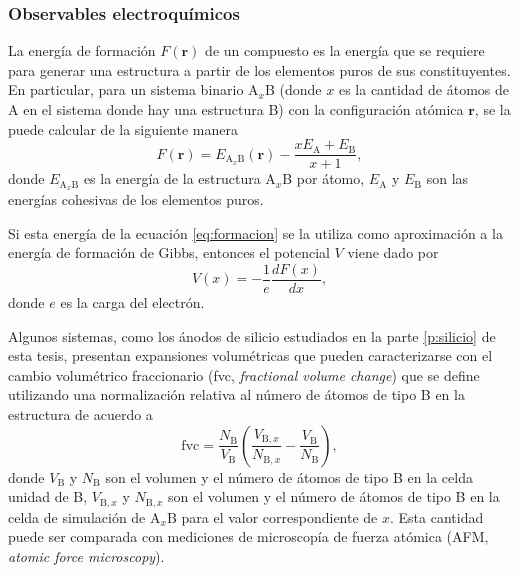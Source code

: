 \subsubsection{Observables electroquímicos}\label{ss:electrochim}

La energía de formación $F(\mathbf{r})$ de un compuesto es la energía que se requiere para generar 
una estructura a partir de los elementos puros de sus constituyentes. En particular, para un sistema binario A$_x$B (donde $x$ es la 
cantidad de átomos de A en el sistema donde hay una estructura B) con la configuración atómica
$\mathbf{r}$, se la puede calcular de la siguiente manera
\begin{equation}\label{eq:formacion}
    F(\mathbf{r}) = E_{\text{A}_x\text{B}}(\mathbf{r}) - \frac{x E_{\text{A}} + E_{\text{B}}}{x + 1},
\end{equation}
donde $E_{\text{A}_x\text{B}}$ es la energía de la estructura A$_x$B por átomo, 
$E_{\text{A}}$ y $E_{\text{B}}$ son las energías cohesivas de los elementos puros.

Si esta energía de la ecuación \ref{eq:formacion} se la utiliza como aproximación 
a la energía de formación de Gibbs, entonces el potencial $V$ viene dado por \cite{urban2016, aydinol1997}
\begin{equation}\label{eq:potencial}
    V(x) = - \frac{1}{e} \frac{d F(x)}{dx},
\end{equation}
donde $e$ es la carga del electrón.

Algunos sistemas, como los ánodos de silicio estudiados en la parte 
\ref{p:silicio} de esta tesis, presentan expansiones volumétricas que pueden 
caracterizarse con el cambio volumétrico fraccionario (fvc, \textit{fractional 
volume change}) que se define utilizando una normalización relativa al número de
átomos de tipo B en la estructura de acuerdo a 
\begin{equation}\label{eq:fvc}
    \text{fvc} = \frac{N_{\text{B}}}{V_{\text{B}}} \left( \frac{V_{\text{B},x}}{N_{\text{B},x}} - \frac{V_{\text{B}}}{N_{\text{B}}} \right),
\end{equation}
donde $V_{\text{B}}$ y $N_{\text{B}}$ son el volumen y el número de átomos de 
tipo B en la celda unidad de B, $V_{\text{B},x}$ y $N_{\text{B},x}$ son el 
volumen y el número de átomos de tipo B en la celda de simulación de A$_x$B para
el valor correspondiente de $x$. Esta cantidad puede ser comparada con mediciones
de microscopía de fuerza atómica (AFM, \textit{atomic force microscopy}).
